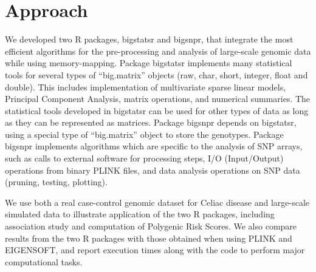 \documentclass{bioinfo}
\begin{document}
\section{Approach}

We developed two R packages, bigstatsr and bigsnpr, that integrate the most efficient algorithms for the pre-processing and analysis of large-scale genomic data while using memory-mapping. Package bigstatsr implements many statistical tools for several types of ``big.matrix'' objects (raw, char, short, integer, float and double). This includes implementation of multivariate sparse linear models, Principal Component Analysis, matrix operations, and numerical summaries. The statistical tools developed in bigstatsr can be used for other types of data as long as they can be represented as matrices. Package bigsnpr depends on bigstatsr, using a special type of ``big.matrix'' object to store the genotypes. Package bigsnpr implements algorithms which are specific to the analysis of SNP arrays, such as calls to external software for processing steps, I/O (Input/Output) operations from binary PLINK files, and data analysis operations on SNP data (pruning, testing, plotting). 


We use both a real case-control genomic dataset for Celiac disease and large-scale simulated data to illustrate application of the two R packages, including association study and computation of Polygenic Risk Scores. We also compare results from the two R packages with those obtained when using PLINK and EIGENSOFT, and report execution times along with the code to perform major computational tasks.
\end{document}

